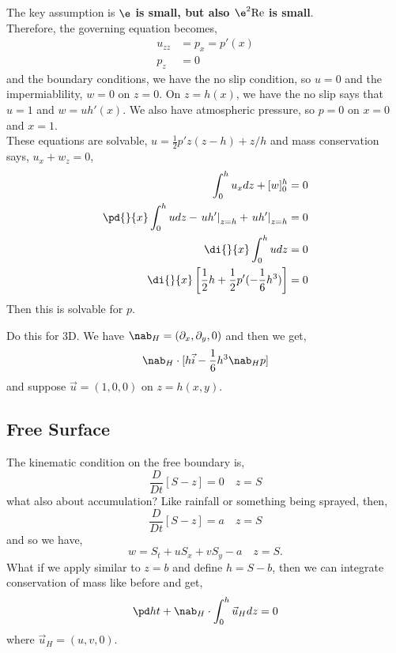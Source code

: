 The key assumption is \textbf{$\e$ is small, but also $\e^2 \mathrm{Re}$ is small}. \\

\noindent
Therefore, the governing equation becomes,
\begin{align*}
  u_{zz} &= p_x = p'(x)\\
  p_z &= 0
\end{align*}
and the boundary conditions, we have the no slip condition, so $u = 0$ and the impermiablility, $w = 0$ on $z = 0$. On $z = h(x)$, we have the no slip says that $u = 1$ and $w = uh'(x)$. We also have atmospheric pressure, so $p = 0$ on $x = 0$ and $x = 1$.\\

\noindent
These equations are solvable, $u = \frac{1}{2}p' z(z - h) + z/h$ and mass conservation says, $u_x + w_z = 0$,
\begin{align*}
  \int_0^h u_x dz + [w]_0^h &= 0 \\
  \pd{}{x}\int_0^h u dz - \left.uh'\right|_{z = h} + \left.uh'\right|_{z = h} &= 0 \\
  \di{}{x} \int_0^h udz &= 0 \\
  \di{}{x} \left[ \frac{1}{2}h + \frac{1}{2}p'(-\frac{1}{6}h^3)\right] &= 0
\end{align*}
Then this is solvable for $p$.

\begin{exercise}
  Do this for 3D.  We have $\nab_H = (\partial_x, \partial_y, 0)$ and then we get,
  $$ \nab_H \cdot [h\vec i - \frac{1}{6}h^3 \nab_H p] $$
  and suppose $\vec u = (1, 0, 0)$ on $z = h(x, y)$.
\end{exercise}

\subsection{Free Surface}
The kinematic condition on the free boundary is,
$$ \frac{D}{Dt}[S - z] = 0 \quad z = S$$
what also about accumulation? Like rainfall or something being sprayed, then,
$$ \frac{D}{Dt}[S - z] = a \quad z = S$$
and so we have,
$$ w = S_t + uS_x + vS_y - a \quad z = S. $$
What if we apply similar to $z = b$ and define $h = S - b$, then we can integrate conservation of mass like before and get,
$$ \pd h t + \nab_H \cdot \int_0^h \vec u_H dz = 0 $$
where $\vec u_H = (u, v, 0)$.

